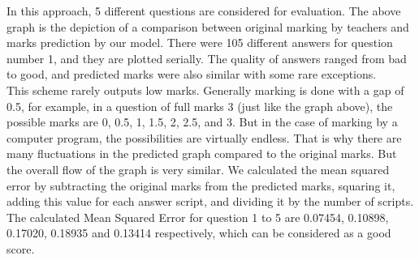 In this approach, 5 different questions are considered for evaluation. The above graph is the depiction of a comparison between original marking by teachers and marks prediction by our model. There were 105 different answers for question number 1, and they are plotted serially. The quality of answers ranged from bad to good, and predicted marks were also similar with some rare exceptions. \\

This scheme rarely outputs low marks. Generally marking is done with a gap of 0.5, for example, in a question of full marks 3 (just like the graph above), the possible marks are 0, 0.5, 1, 1.5, 2, 2.5, and 3. But in the case of marking by a computer program, the possibilities are virtually endless. That is why there are many fluctuations in the predicted graph compared to the original marks. But the overall flow of the graph is very similar. We calculated the mean squared error by subtracting the original marks from the predicted marks, squaring it, adding this value for each answer script, and dividing it by the number of scripts. 
The calculated Mean Squared Error for question 1 to 5 are 0.07454, 0.10898, 0.17020, 0.18935 and 0.13414 respectively, which can be considered as a good score.
